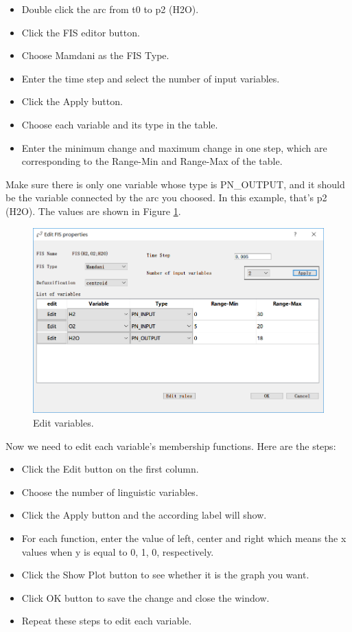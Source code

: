 \documentclass[journal,a4paper,onecolumn]{article}
\begin{document}
\begin{itemize}
	\item Double click the arc from t0 to p2 (H2O).
	\item Click the FIS editor button.
	\item Choose Mamdani as the FIS Type.
	\item Enter the time step and select the number of input variables.
	\item Click the Apply button.
	\item Choose each variable and its type in the table.
	\item Enter the minimum change and maximum change in one step, which are corresponding to the Range-Min and Range-Max of the table.
\end{itemize}

Make sure there is only one variable whose type is PN\_OUTPUT, and it should be the variable connected by the arc you choosed. In this example, that's p2 (H2O). The values are shown in Figure \ref{fig:Edit variables}.

\begin{figure}[!hbt]
	\begin{center}
		\includegraphics[width=\columnwidth]{fig8}
		\caption{Edit variables.}
		\label{fig:Edit variables}
	\end{center}
\end{figure}

Now we need to edit each variable's membership functions. Here are the steps:
\begin{itemize}
	\item Click the Edit button on the first column.
	\item Choose the number of linguistic variables.
	\item Click the Apply button and the according label will show.
	\item For each function, enter the value of left, center and right which means the x values when y is equal to 0, 1, 0, respectively.
	\item Click the Show Plot button to see whether it is the graph you want.
	\item Click OK button to save the change and close the window.
	\item Repeat these steps to edit each variable.
\end{itemize}
\end{document}
